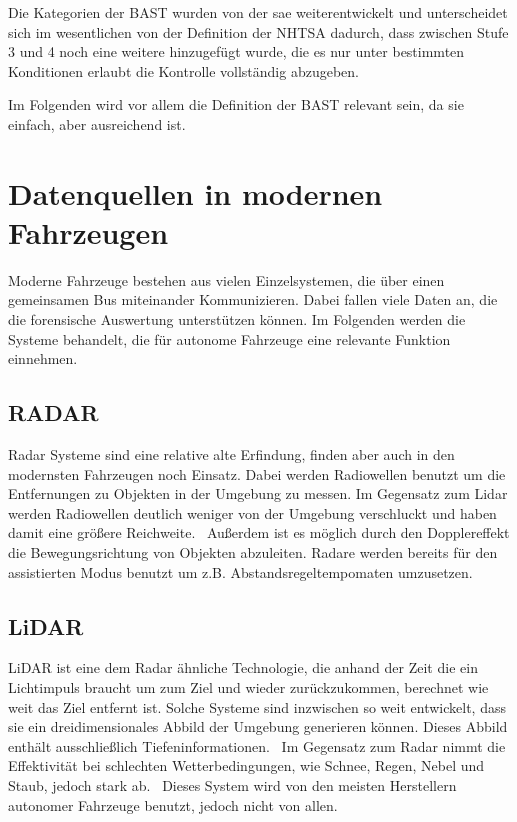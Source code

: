 \documentclass[conference,compsoc,final,a4paper]{IEEEtran}
\begin{document}
Die Kategorien der \ac{BAST} wurden von der \ac{sae} weiterentwickelt \cite{bast2021} und unterscheidet sich im wesentlichen von der Definition der \ac{NHTSA} dadurch, dass zwischen Stufe 3 und 4 noch eine weitere hinzugefügt wurde, die es nur unter bestimmten Konditionen erlaubt die Kontrolle vollständig abzugeben\cite{SAE2021}.

Im Folgenden wird vor allem die Definition der \ac{BAST} relevant sein, da sie einfach, aber ausreichend ist.

\section{Datenquellen in modernen Fahrzeugen}

Moderne Fahrzeuge bestehen aus vielen Einzelsystemen, die über einen gemeinsamen Bus miteinander Kommunizieren.
Dabei fallen viele Daten an, die die forensische Auswertung unterstützen können. Im Folgenden werden die Systeme behandelt,
die für autonome Fahrzeuge eine relevante Funktion einnehmen.


\subsection{RADAR}

Radar Systeme sind eine relative alte Erfindung, finden aber auch in den modernsten Fahrzeugen noch Einsatz.
Dabei werden Radiowellen benutzt um die Entfernungen zu Objekten in der Umgebung zu messen.
Im Gegensatz zum Lidar werden Radiowellen deutlich weniger von der Umgebung verschluckt und haben damit eine
größere Reichweite.~\cite{Neal2018} Außerdem ist es möglich durch den Dopplereffekt die Bewegungsrichtung von Objekten abzuleiten.
Radare werden bereits für den assistierten Modus benutzt um z.B. Abstandsregeltempomaten umzusetzen.

\subsection{LiDAR}

\ac{LiDAR} ist eine dem Radar ähnliche Technologie, die anhand der Zeit die ein Lichtimpuls braucht um zum Ziel und wieder zurückzukommen, berechnet wie weit das Ziel entfernt ist. Solche Systeme sind inzwischen so weit entwickelt, dass sie ein
dreidimensionales Abbild der Umgebung generieren können.
Dieses Abbild enthält ausschließlich Tiefeninformationen.~\cite{Liu2018}
Im Gegensatz zum Radar nimmt die Effektivität bei schlechten Wetterbedingungen, wie Schnee, Regen, Nebel und Staub, jedoch stark ab.~\cite{Neal2018}
Dieses System wird von den meisten Herstellern autonomer Fahrzeuge benutzt, jedoch nicht von allen.~\cite{Dickson2021}
\end{document}
